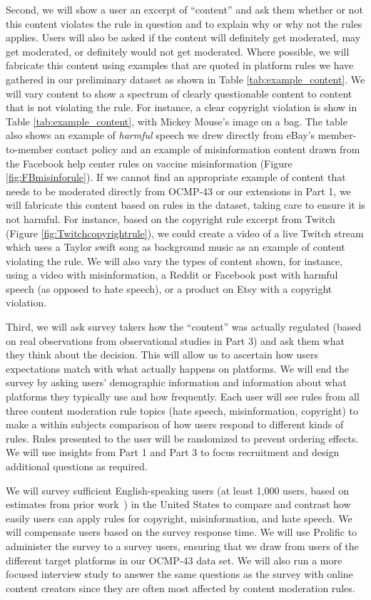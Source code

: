 Second, we will show a user an excerpt of ``content'' and ask them
whether or not this content violates the rule in question and to explain why
or why not the rules applies. Users will also be asked if the content will definitely get moderated, may get moderated, or definitely would not get moderated. Where possible, we will fabricate this content using examples that are quoted in platform rules we have gathered in our preliminary dataset as shown in Table \ref{tab:example_content}. We will vary content to show a spectrum of clearly questionable content to content that is not violating the rule. For instance, a clear copyright violation is show in Table \ref{tab:example_content}, with Mickey Mouse's image on a bag. The table also shows an example of \textit{harmful} speech we drew directly from eBay's member-to-member contact policy and an example of misinformation content drawn from the Facebook help center rules on vaccine misinformation (Figure \ref{fig:FBmisinforule}). If we cannot find an appropriate example of content that needs to be moderated directly from OCMP-43 or our extensions in Part 1, we will fabricate this content based on rules in the dataset, taking care to ensure it is not harmful. For instance, based on the copyright rule excerpt from Twitch (Figure \ref{fig:Twitchcopyrightrule}), we could create a video of a live Twitch stream which uses a Taylor swift song as background music as an example of content violating the rule. We will also vary the types of content shown, for
instance, using a video with misinformation, a Reddit or Facebook post with
harmful speech (as opposed to hate speech), or a product on Etsy with a copyright violation.

Third, we will ask survey takers how the ``content'' was actually regulated (based on real
observations from observational studies in Part 3) and ask them what they think about the
decision. This will allow us to ascertain how users expectations match with
what actually happens on platforms. We will end the survey by asking
users' demographic information and information about what platforms they
typically use and how frequently. Each user will see
rules from all three content moderation rule topics (hate speech, misinformation, copyright) to make a within subjects
comparison of how users respond to different kinds of rules. Rules presented
to the user will be randomized to prevent ordering effects. We will use insights from Part 1 and Part 3 to focus
recruitment and design additional questions as required. 

We will survey sufficient English-speaking users (at least 1,000 users, based
on estimates from prior work~\cite{mathur_endorsements_2018}) in the
United States to compare and contrast how easily users can apply rules
for copyright, misinformation, and hate speech. We will compensate users based on the
survey response time. We will use Prolific to
administer the survey to a survey users, ensuring that we draw
from users of the different target platforms in our OCMP-43 data set. We will also run a more focused interview study to answer the same questions as the survey with online content creators since they are often most affected by content moderation rules. 

